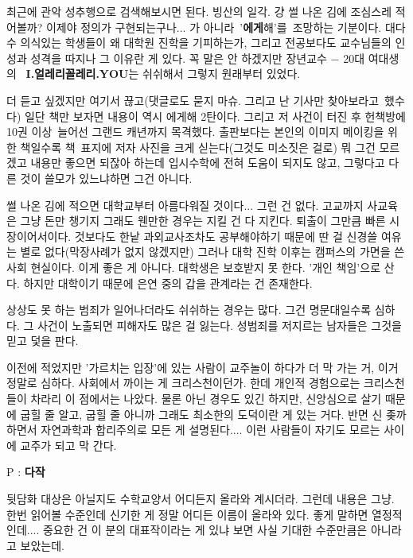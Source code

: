 최근에 관악 성추행으로 검색해보시면 된다.
빙산의 일각.
걍 썰 나온 김에 조심스레 적어볼까?
이제야 정의가 구현되는구나... 가 아니라 '\textbf{에게}해'를 조망하는 기분이다.
대다수 의식있는 학생들이 왜 대학원 진학을 기피하는가, 그리고 전공보다도 교수님들의 인성과 성격을 따지나 그 이유란 게 있다.
꼭 말은 안 하겠지만 장년교수 $-$ 20대 여대생의  \textbf{I.얼레리꼴레리.YOU}는 쉬쉬해서 그렇지 원래부터 있었다.
\vspace{5mm}

더 듣고 싶겠지만 여기서 끊고(댓글로도 묻지 마슈. 그리고 난 기사만 찾아보라고 했수다)
일단 책만 보자면 내용이 역시 에게해 2탄이다. 그리고 저 사건이 터진 후 헌책방에 10권 이상 늘어선 그랜드 캐년까지 목격했다.
출판보다는 본인의 이미지 메이킹을 위한 책일수록 책 표지에 저자 사진을 크게 싣는다(그것도 미소짓은 걸로)
뭐 그건 모르겠고 내용만 좋으면 되잖아 하는데 입시수학에 전혀 도움이 되지도 않고,
그렇다고 다른 것이 쓸모가 있느냐하면 그건 아니다.
\vspace{5mm}

썰 나온 김에 적으면 대학교부터 아름다워질 것이다... 그런 건 없다.
고교까지 사교육은 그냥 돈만 챙기지 그래도 웬만한 경우는 지킬 건 다 지킨다. 퇴출이 그만큼 빠른 시장이어서이다.
것보다도 한낱 과외교사조차도 공부해야하기 때문에 딴 걸 신경쓸 여유는 별로 없다(막장사례가 없지 않겠지만)
그러나 대학 진학 이후는 캠퍼스의 가면을 쓴 사회 현실이다. 이게 좋은 게 아니다.
대학생은 보호받지 못 한다. '개인 책임'으로 산다. 하지만 대학이기 때문에 은연 중의 갑을 관계라는 건 존재한다.
\vspace{5mm}

상상도 못 하는 범죄가 일어나더라도 쉬쉬하는 경우는 많다. 그건 명문대일수록 심하다.
그 사건이 노출되면 피해자도 많은 걸 잃는다. 성범죄를 저지르는 남자들은 그것을 믿고 덫을 판다.
\vspace{5mm}

이전에 적었지만 '가르치는 입장'에 있는 사람이 교주놀이 하다가 더 막 가는 거, 이거 정말로 심하다.
사회에서 까이는 게 크리스천이던가. 한데 개인적 경험으로는 크리스천들이 차라리 이 점에서는 나았다.
물론 아닌 경우도 있긴 하지만, 신앙심으로 살기 때문에 굽힐 줄 알고, 굽힐 줄 아니까 그래도 최소한의 도덕이란 게 있는 거다.
반면 신 좆까 하면서 자연과학과 합리주의로 모든 게 설명된다.... 이런 사람들이 자기도 모르는 사이에 교주가 되고 막 간다.
\vspace{5mm}

P : \textbf{다작}
\vspace{5mm}

뒷담화 대상은 아닐지도 수학교양서 어디든지 올라와 계시더라.
그런데 내용은 그냥. 한번 읽어볼 수준인데 신기한 게 정말 어디든 이름이 올라와 있다.
좋게 말하면 열정적인데.... 중요한 건 이 분의 대표작이라는 게 있냐 보면 사실 기대한 수준만큼은 아니라고 보았는데.
\vspace{5mm}

